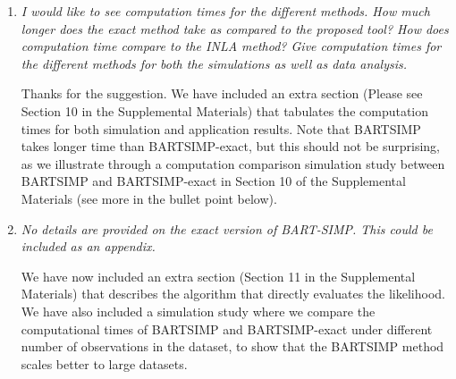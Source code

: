 \documentclass[12pt]{article}
\begin{document}
\begin{enumerate}
{\begin{itemize}
    \item $\sigma_m^2, \sigma_e^2$ and $\kappa$: the spatial hyperparameters
    \item $\sum_{j=1}^m g(\boldsymbol{x}_{i} ; \mathbf{T}_j, \boldsymbol{\mu}_j), i \in \{400, 500, 750\}$: the fitted covariate values for the 400, 500 and 750-th row in the dataset. We refer to them as `location 1',  `location 2' and `location 3'. 
\end{itemize}

Table 6 in Supplementary Materials, Section 9 shows the efficient sample sizes of the quantities of interest, averaged over 10 datasets for each scenario, obtained from 2000 posterior samples. Each row represents a different scenario (1-5 for `tree structured', 6-10 for `linear' and 11-15 for `smooth'). Additionally, we generated line plots for the six quantites from three individual datasets, shown in Figures 12 to 15 in Supplementary Materials, Section 9. \\
Finally, we added a sentence ``We also conducted convergence analyses on the posterior samples from the simulation studies, with results shown in Supplementary Materials, Section 9.'' at the end of the Section 5 in the main paper.
}

\item {\it I would like to see computation times for the different methods. How much longer does the exact method take as compared to the proposed tool? How does computation time compare to the INLA method? Give computation times for the different methods for both the simulations as well as data analysis.}\\

{
\color{darkblue}

Thanks for the suggestion. We have included an extra section (Please see Section 10 in the Supplemental Materials) that tabulates the computation times for both simulation and application results. Note that BARTSIMP takes longer time than BARTSIMP-exact, but this should not be surprising, as we illustrate through a computation comparison simulation study between BARTSIMP and BARTSIMP-exact in Section 10 of the Supplemental Materials (see more in the bullet point below).
}

\item {\it No details are provided on the exact version of BART-SIMP. This could be included as an appendix.}\\

{
\color{darkblue}

We have now included an extra section (Section 11 in the Supplemental Materials) that describes the algorithm that directly evaluates the likelihood. We have also included a simulation study where we compare the computational times of BARTSIMP and BARTSIMP-exact under different number of observations in the dataset, to show that the BARTSIMP method scales better to large datasets. \\
}

\end{enumerate}





\end{document}
